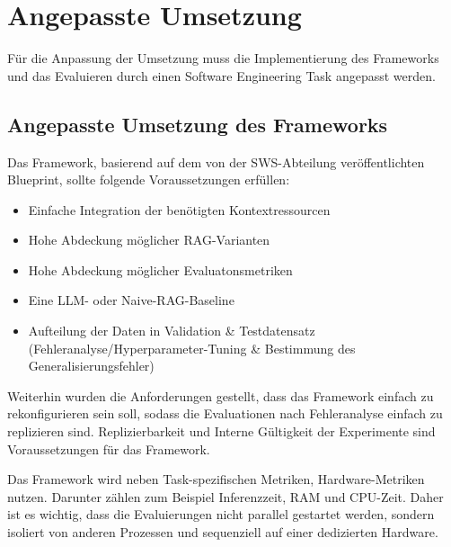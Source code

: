 \documentclass[letterpaper, 10 pt, conference]{ieeeconf}
\begin{document}
\section{Angepasste Umsetzung}
Für die Anpassung der Umsetzung muss die Implementierung des Frameworks und das Evaluieren durch einen Software Engineering Task angepasst werden. \\

\subsection{Angepasste Umsetzung des Frameworks}
Das Framework, basierend auf dem von der SWS-Abteilung veröffentlichten Blueprint, sollte folgende Voraussetzungen erfüllen:\\[6pt]

\begin{itemize}
   \item Einfache Integration der benötigten Kontextressourcen
   \item Hohe Abdeckung möglicher RAG-Varianten
   \item Hohe Abdeckung möglicher Evaluatonsmetriken
   \item Eine LLM- oder Naive-RAG-Baseline
   \item Aufteilung der Daten in Validation \& Testdatensatz (Fehleranalyse/Hyperparameter-Tuning \& Bestimmung des Generalisierungsfehler)\\
\end{itemize}

Weiterhin wurden die Anforderungen gestellt, dass das Framework einfach zu rekonfigurieren sein soll, sodass die Evaluationen nach Fehleranalyse einfach zu replizieren sind. 
Replizierbarkeit und Interne Gültigkeit der Experimente sind Voraussetzungen für das Framework. 

Das Framework wird neben Task-spezifischen Metriken, Hardware-Metriken nutzen. Darunter zählen zum Beispiel Inferenzzeit, RAM und CPU-Zeit. 
Daher ist es wichtig, dass die Evaluierungen nicht parallel gestartet werden, sondern isoliert von anderen Prozessen und sequenziell auf einer dedizierten Hardware. \\
\end{document}
